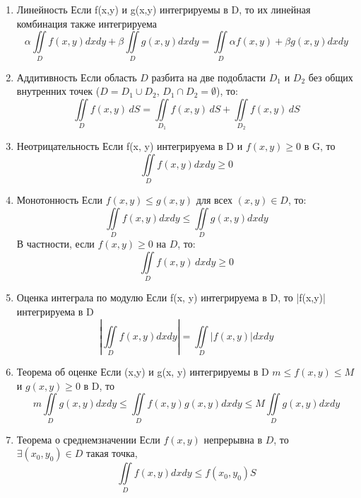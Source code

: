 \documentclass[16pt]{extarticle}
\begin{document}
\begin{enumerate}
  \item Линейность
    Если f(x,y) и g(x,y) интегрируемы в D, то их линейная комбинация также интегрируема
    \begin{equation}
      \alpha \iint\limits_D f(x,y) dxdy + \beta \iint\limits_D g(x,y) dxdy = \iint\limits_D \alpha f(x,y) + \beta g(x,y) dxdy
    \end{equation}
  \item Аддитивность
    Если область $D$ разбита на две подобласти $D_1$ и $D_2$ без общих внутренних точек
    ($D = D_1 \cup D_2$, $D_1 \cap D_2 = \emptyset$), то:
    \begin{equation}
      \iint\limits_D f(x,y) \, dS =
      \iint\limits_{D_1} f(x,y) \, dS +
      \iint\limits_{D_2} f(x,y) \, dS
    \end{equation}
  \item Неотрицательность
    Если f(x, y) интегрируема в D и $f(x,y) \geq 0$ в G, то
    \begin{equation}
      \iint\limits_D f(x,y) dxdy \geq 0
    \end{equation}
  \item Монотонность
    Если $f(x,y) \leq g(x,y)$ для всех $(x,y) \in D$, то:
    \begin{equation}
      \iint\limits_D f(x,y) dxdy \leq \iint\limits_D g(x,y) dxdy
    \end{equation}
    В частности, если $f(x,y) \geq 0$ на $D$, то:
    \begin{equation}
      \iint\limits_D f(x,y) \, dxdy \geq 0
    \end{equation}
  \item Оценка интеграла по модулю
    Если f(x, y) интегрируема в D, то |f(x,y)| интегрируема в D
    \begin{equation}
      |\iint\limits_D f(x,y)dxdy|  = \iint\limits_D |f(x,y)| dxdy
    \end{equation}
  \item  Теорема об оценке
    Если (x,y) и g(x, y) интегрируемы в D $m \leq f(x,y) \leq M$ и $g(x,y) \geq 0$ в D, то
    \begin{equation}
      m\iint\limits_D g(x,y) dxdy \leq \iint\limits_D f(x,y)g(x,y) dxdy \leq M\iint\limits_D g(x,y) dxdy
    \end{equation}
  \item Теорема о среднемзначении
    Если $f(x, y)$ непрерывна в $D$, то $\exists (x_0, y_0) \in D$ такая точка,
    \begin{equation}
      \iint\limits_D f(x,y) dxdy \leq f(x_0, y_0) S
    \end{equation}
\end{enumerate}
\end{document}
